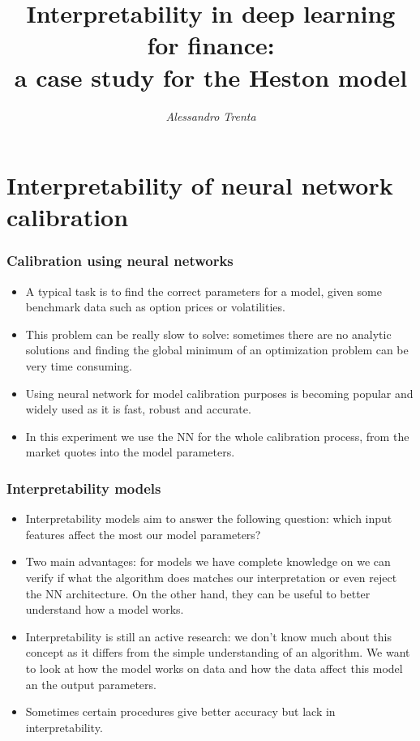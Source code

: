 \documentclass{beamer}
\title[Interpretability in deep learning for finance]{Interpretability in deep learning for finance: \\a case study for the Heston model} %
\author[Alessandro Trenta]{\emph{Alessandro Trenta}} %
\institute[SNS] %
{Scuola Normale Superiore \\ %
}
\date{} %
\theoremstyle{plain}
\theoremstyle{definition}
\theoremstyle{remark}
\begin{document}
\begin{frame}
	\titlepage %
\end{frame}

\begin{frame}
	\tableofcontents
\end{frame}

\section{Interpretability of neural network calibration}

\begin{frame}
	\frametitle{Calibration using neural networks}
	\begin{itemize}
		\item A typical task is to find the correct parameters for a model, given some benchmark data such as option prices or volatilities.
		\item This problem can be really slow to solve: sometimes there are no analytic solutions and finding the global minimum of an optimization problem can be very time consuming.
		\item Using neural network for model calibration purposes is becoming popular and widely used as it is fast, robust and accurate.
		\item In this experiment we use the NN for the whole calibration process, from the market quotes into the model parameters.
	\end{itemize}
\end{frame}

\begin{frame}
	\frametitle{Interpretability models}
	\begin{itemize}
		\item Interpretability models aim to answer the following question: which input features affect the most our model parameters?
		\item Two main advantages: for models we have complete knowledge on we can verify if what the algorithm does matches our interpretation or even reject the NN architecture. On the other hand, they can be useful to better understand how a model works.
		\item Interpretability is still an active research: we don't know much about this concept as it differs from the simple understanding of an algorithm. We want to look at how the model works on data and how the data affect this model an the output parameters.
		\item Sometimes certain procedures give better accuracy but lack in interpretability.
	\end{itemize}
	
\end{frame}
\end{document}
